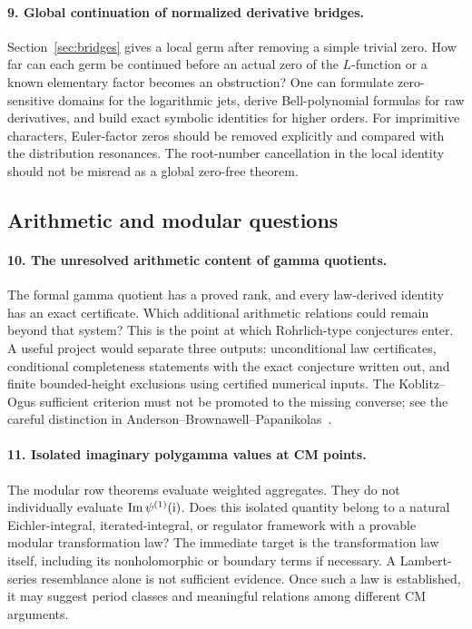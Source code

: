 \paragraph{9. Global continuation of normalized derivative bridges.}
Section~\ref{sec:bridges} gives a local germ after removing a simple
trivial zero. How far can each germ be continued before an actual
zero of the \(L\)-function or a known elementary factor becomes an
obstruction? One can formulate zero-sensitive domains for the
logarithmic jets, derive Bell-polynomial formulas for raw derivatives,
and build exact symbolic identities for higher orders.
For imprimitive characters, Euler-factor zeros should be removed
explicitly and compared with the distribution resonances.
The root-number cancellation in the local identity should not be
misread as a global zero-free theorem.

\subsection{Arithmetic and modular questions}

\paragraph{10. The unresolved arithmetic content of gamma quotients.}
The formal gamma quotient has a proved rank, and every law-derived
identity has an exact certificate. Which additional arithmetic
relations could remain beyond that system? This is the point at
which Rohrlich-type conjectures enter. A useful project would separate
three outputs: unconditional law certificates, conditional
completeness statements with the exact conjecture written out, and
finite bounded-height exclusions using certified numerical inputs.
The Koblitz--Ogus sufficient criterion must not be promoted to the
missing converse; see the careful distinction in
Anderson--Brownawell--Papanikolas~\cite{ABP}.

\paragraph{11. Isolated imaginary polygamma values at CM points.}
The modular row theorems evaluate weighted aggregates. They do not
individually evaluate \(\operatorname{Im}\psi^{(1)}(\mathrm{i})\).
Does this isolated quantity belong to a natural Eichler-integral,
iterated-integral, or regulator framework with a provable modular
transformation law? The immediate target is the transformation law
itself, including its nonholomorphic or boundary terms if necessary.
A Lambert-series resemblance alone is not sufficient evidence.
Once such a law is established, it may suggest period classes and
meaningful relations among different CM arguments.

